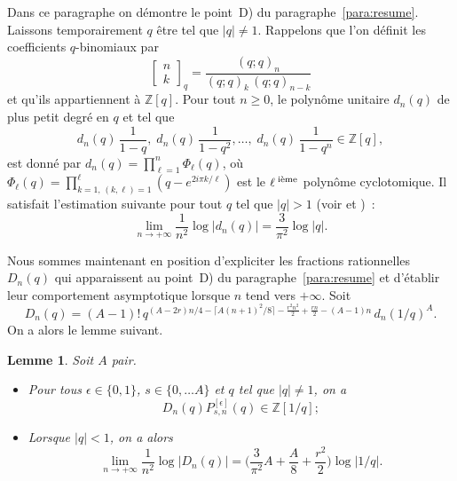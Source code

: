 \documentclass[12pt]{amsart}
\newcommand{\io}{\infty}
\newcommand{\ep}{\epsilon}
\newcommand{\dis}{\displaystyle}
\newtheorem{lem}{Lemme}
\theoremstyle{remark}
\numberwithin{equation}{section}
\begin{document}
Dans ce paragraphe on d{\'e}montre le point~D) du
paragraphe~\ref{para:resume}.
Laissons temporairement $q$ {\^e}tre  tel que $\vert q\vert \ne 1$.
Rappelons que l'on d{\'e}finit les coefficients $q$-binomiaux par 
$$
\begin{bmatrix} n\\  k\end{bmatrix}_{q}=\frac{(q;q)_n}{(q;q)_k\,(q;q)_{n-k}}
$$
et qu'ils appartiennent {\`a} $\mathbb{Z}[q]$.   
Pour tout $n\ge 0$, le polyn{\^o}me unitaire $d_n(q)$ de plus petit degr{\'e} 
en $q$ et tel que  
$$
d_n(q)\,\frac{1}{1-q},\; d_n(q)\,\frac{1}{1-q^2}, \ldots,\; 
d_n(q)\,\frac{1}{1-q^n} \in\mathbb{Z}[q],
$$ 
est donn{\'e} par 
$\dis d_n(q)=\prod_{\ell=1}^n \Phi_{\ell}(q)$, o{\`u} 
$\dis \Phi_{\ell}(q)=\prod_{k=1,\,(k,\ell)=1}^{\ell}(q-e^{2i\pi k/\ell})$ 
est le $\ell^{\;\textup{i{\`e}me}}$ polyn{\^o}me cyclotomique.   
Il satisfait l'estimation suivante pour tout $q$ tel que $\vert q\vert
>1$ (voir \cite[\S2]{buv} et \cite[Lemma~2]{vana})~: 
\begin{equation} \label{eq:dnasy} 
\lim_{n\to +\io} \frac{1}{n^2}\log\vert d_n(q)\vert=\frac{3}{\pi^2}\log\vert q\vert.
\end{equation}

Nous sommes maintenant en position d'expliciter 
les fractions rationnelles $D_n(q)$ qui
apparaissent au point~D) du paragraphe~\ref{para:resume} 
et d'{\'e}tablir leur comportement asymptotique lorsque $n$ tend vers
$+\infty$. Soit
\begin{equation} \label{eq:Dndef}
D_n(q)=(A-1)!\, q^{(A-2r)n/4-\lceil A (n+1)^2/8\rceil
-\frac {r^2n^2} {2}+\frac {rn} {2}- (A-1)n}\,
d_n(1/q)^{A}.
\end{equation}
On a alors le lemme suivant.


\begin{lem} \label{lem:arith}
Soit $A$ pair. 

\begin{itemize}
\item[\em i)] 
Pour tous $\ep\in\{0,1\}$, $s\in\{0,\ldots A\}$ et $q$ tel que $\vert
q\vert\ne 1$, on a
$$
D_n(q)P_{s,n}^{[\ep]}(q)\in\mathbb{Z}[1/q];
$$
\item[\em ii)] 
Lorsque $\vert q\vert <1$, on a alors
$$
\lim_{n\to +\io} \frac{1}{n^2}\log \vert D_n(q) \vert
= \biggl(\frac{3}{\pi^2}A+\frac A8 + \frac {r^2} 2\biggr)\log \vert 1/q\vert.
$$ 
\end{itemize}
\end{lem}
\end{document}
